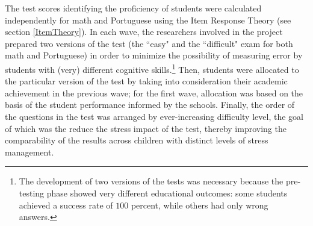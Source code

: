 \documentclass[a4paper, 12pt]{article}
\begin{document}

The test scores identifying the proficiency of students were calculated independently for math and Portuguese using the Item Response Theory (see section \ref{ItemTheory}). In each wave, the researchers involved in the project prepared two versions of the test (the ``easy" and the ``difficult" exam for both math and Portuguese) in order to minimize the possibility of measuring error by students with (very) different cognitive skills.\footnote{The development of two versions of the tests was necessary because the pre-testing phase showed very different educational outcomes: some students achieved a success rate of $100$ percent, while others had only wrong answers.} Then, students were allocated to the particular version of the test by taking into consideration their academic achievement in the previous wave; for the first wave, allocation was based on the basis of the student performance informed by the schools. Finally, the order of the questions in the test was arranged by ever-increasing difficulty level, the goal of which was the reduce the stress impact of the test, thereby improving the comparability of the results across children with distinct levels of stress management.
\end{document}
